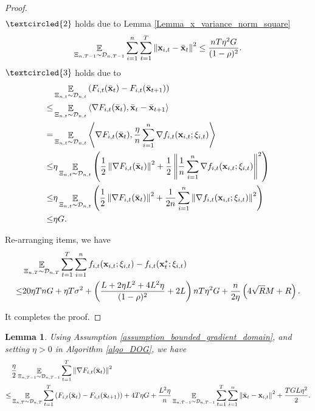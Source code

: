 \documentclass{article}
\newtheorem{Lemma}{\bf{Lemma}}
\begin{document}
\begin{proof}
\begin{align}
\end{align} $\textcircled{2}$ holds due to Lemma \ref{Lemma_x_variance_norm_square}
\begin{align}
\nonumber
\mathop{\mathbb{E}}_{ \Xi_{n,T-1} \sim \mathcal{D}_{n,T-1} } \sum_{i=1}^n\sum_{t=1}^T \left\lVert{\bf x}_{i,t} - \bar{{\bf x}}_t\right\rVert^2 \le \frac{nT\eta^2 G }{(1-\rho)^2}.
\end{align} $\textcircled{3}$ holds due to 
\begin{align}
\nonumber
& \mathop{\mathbb{E}}_{ \Xi_{n,t} \sim \mathcal{D}_{n,t} } \left( F_{i,t}(\bar{{\bf x}}_t) - F_{i,t}(\bar{{\bf x}}_{t+1})  \right) \\ \nonumber 
\le & \mathop{\mathbb{E}}_{ \Xi_{n,t} \sim \mathcal{D}_{n,t} } \left\langle\nabla F_{i,t}(\bar{{\bf x}}_t), \bar{{\bf x}}_t - \bar{{\bf x}}_{t+1} \right\rangle \\ \nonumber
= & \mathop{\mathbb{E}}_{ \Xi_{n,t} \sim \mathcal{D}_{n,t} } \left\langle\nabla F_{i,t}(\bar{{\bf x}}_t), \frac{\eta}{n}\sum_{i=1}^n\nabla f_{i,t}({\bf x}_{i,t};\xi_{i,t})  \right\rangle \\ \nonumber
\le & \eta\mathop{\mathbb{E}}_{ \Xi_{n,t} \sim \mathcal{D}_{n,t} }\left(  \frac{1}{2}\left\lVert\nabla F_{i,t}(\bar{{\bf x}}_t)\right\rVert^2 + \frac{1}{2} \left\lVert\frac{1}{n}\sum_{i=1}^n\nabla f_{i,t}({\bf x}_{i,t};\xi_{i,t})\right\rVert^2  \right)\\ \nonumber
\le & \eta\mathop{\mathbb{E}}_{ \Xi_{n,t} \sim \mathcal{D}_{n,t} }\left(  \frac{1}{2}\left\lVert\nabla F_{i,t}(\bar{{\bf x}}_t)\right\rVert^2 + \frac{1}{2n}\sum_{i=1}^n\left\lVert\nabla f_{i,t}({\bf x}_{i,t};\xi_{i,t})\right\rVert^2  \right)\\ \nonumber
\le & \eta G. 
\end{align}

Re-arranging items, we have
\begin{align}
\nonumber
& \mathop{\mathbb{E}}_{ \Xi_{n,T} \sim \mathcal{D}_{n,T} } \sum_{t=1}^T\sum_{i=1}^n f_{i,t}({\bf x}_{i,t};\xi_{i,t}) - f_{i,t}({\bf x}_t^\ast;\xi_{i,t}) \\ \nonumber
\le & 20\eta T n G +  \eta T\sigma^2 + \left( \frac{L + 2\eta L^2  + 4L^2 \eta}{(1-\rho)^2} +2L \right)  nT\eta^2 G    + \frac{n}{2\eta}\left(  4\sqrt{R}M + R   \right).
\end{align}

It completes the proof.



\end{proof}




\begin{Lemma}
\label{Lemma_gradient_norm_bound}
Using Assumption \ref{assumption_bounded_gradient_domain}, and setting $\eta>0$ in Algorithm \ref{algo_DOG}, we have 
\begin{align}
& \frac{\eta}{2} \mathop{\mathbb{E}}_{ \Xi_{n,T-1} \sim \mathcal{D}_{n,T-1} }\sum_{t=1}^T \left\lVert\nabla F_{i,t}(\bar{{\bf x}}_t)\right\rVert^2 \\ \nonumber
\le & \mathop{\mathbb{E}}_{ \Xi_{n,T} \sim \mathcal{D}_{n,T} } \sum_{t=1}^T  \left( F_{i,t}(\bar{{\bf x}}_t) - F_{i,t}(\bar{{\bf x}}_{t+1}) \right) + 4T  \eta G + \frac{ L^2 \eta}{n}\mathop{\mathbb{E}}_{ \Xi_{n,T-1} \sim \mathcal{D}_{n,T-1} }\sum_{t=1}^T\sum_{i=1}^n \left\lVert \bar{{\bf x}}_t - {\bf x}_{i,t} \right\rVert^2 + \frac{TGL\eta^2}{2}.
\end{align}
\end{Lemma}
\end{document}
